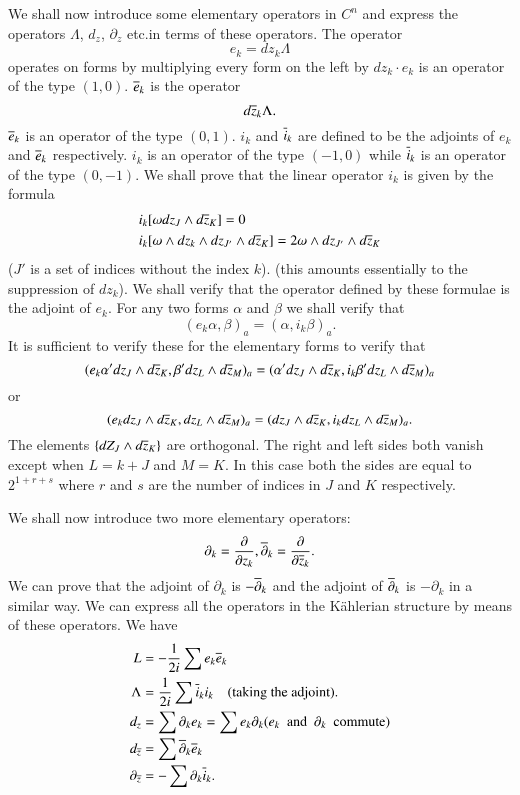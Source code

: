 We shall now introduce some elementary operators in $C^{n}$ and
express the operators $\Lambda$, $d_{z}$, $\partial_{z}$ etc.\@ in
terms of these operators. The operator
$$
e_{k}=dz_{k}\Lambda
$$
operates on forms by multiplying every form on the left by
$dz_{k}\cdot e_{k}$ is an operator of the type $(1,0)$. $\overline{e}_{k}$
is the operator
$$
d\overline{z}_{k}\Lambda.
$$
$\overline{e}_{k}$ is an operator of the type $(0,1)$. $i_{k}$ and
$\overline{i}_{k}$ are defined to be the adjoints of $e_{k}$ and
$\overline{e}_{k}$ respectively. $i_{k}$ is an operator of the type $(-1,0)$
while $\overline{i}_{k}$ is an operator of the type $(0,-1)$. We shall prove
that the linear operator $i_{k}$ is given by the formula
\begin{align*}
& i_{k}[\omega dz_{J}\wedge d\overline{z}_{K}]=0\\
& i_{k}[\omega\wedge dz_{k}\wedge dz_{J'}\wedge d\overline{z}_{K}]=2\omega
  \wedge dz_{J'}\wedge d\overline{z}_{K}
\end{align*}
($J'$ is a set of indices without the index $k$). (this amounts
essentially to the suppression of $dz_{k}$). We shall verify that the
operator defined by these formulae is the adjoint of $e_{k}$. For any
two forms $\alpha$ and $\beta$ we shall verify that 
$$
(e_{k}\alpha,\beta)_{a}=(\alpha,i_{k}\beta)_{a}.
$$\pageoriginale
It is sufficient to verify these for the elementary forms \iec to
verify that
$$
(e_{k}\alpha'dz_{J}\wedge d\overline{z}_{K},\beta'dz_{L}\wedge
  d\overline{z}_{M})_{a}=(\alpha'dz_{J}\wedge
  d\overline{z}_{K},i_{k}\beta'dz_{L}\wedge d\overline{z}_{M})_{a}
$$
or
$$
(e_{k}dz_{J}\wedge d\overline{z}_{K}, dz_{L}\wedge
d\overline{z}_{M})_{a}=(dz_{J}\wedge d\overline{z}_{K},i_{k}dz_{L}\wedge
d\overline{z}_{M})_{a}.
$$
The elements $\{dZ_{J}\wedge d\overline{z}_{K}\}$ are orthogonal. The right
and left sides both vanish except when $L=k+J$ and $M=K$. In this case
both the sides are equal to $2^{1+r+s}$ where $r$ and $s$ are the
number of indices in $J$ and $K$ respectively.

We shall now introduce two more elementary operators:
$$
\partial_{k}=\frac{\partial}{\partial
  z_{k}},\overline{\partial}_{k}=\frac{\partial}{\partial \overline{z}_{k}}.
$$
We can prove that the adjoint of $\partial_{k}$ is
$-\overline{\partial}_{k}$ and the adjoint of $\overline{\partial}_{k}$ is
$-\partial_{k}$ in a similar way. We can express all the operators in
the K\"ahlerian structure by means of these operators. We have 
\begin{align*}
L &=-\frac{1}{2i}\sum e_{k}\overline{e}_{k}\\
\Lambda &= \frac{1}{2i}\sum \overline{i}_{k}i_{k}\quad \text{(taking the
  adjoint).}\\
d_{z} &= \sum\partial_{k}e_{k}=\sum e_{k}\partial_{k}(e_{k}\text{
  \  and \ } \partial_{k}\text{ \ commute})\\
d_{\overline{z}} &= \sum\overline{\partial}_{k}\overline{e}_{k}\\
\partial_{\overline{z}} &= -\sum\partial_{k}\overline{i}_{k}.
\end{align*}\pageoriginale

